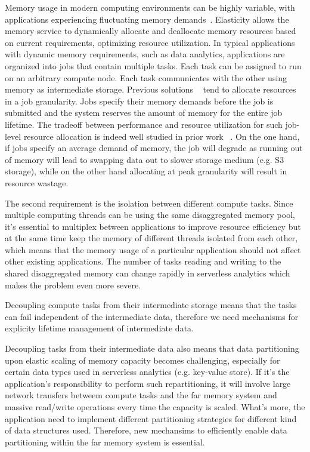   Memory usage in modern computing environments can be highly variable, with applications experiencing fluctuating memory demands~\cite{jiffy}. Elasticity allows the memory service to dynamically allocate and deallocate memory resources based on current requirements, optimizing resource utilization. In typical applications with dynamic memory requirements, such as data analytics, applications are organized into jobs that contain multiple tasks. Each task can be assigned to run on an arbitrary compute node. Each task communicates with the other using memory as intermediate storage. Previous solutions ~\cite{pocket} tend to allocate resources in a job granularity. Jobs specify their memory demands before the job is submitted and the system reserves the amount of memory for the entire job lifetime. The tradeoff between performance and resource utilization for such job-level resource allocation is indeed well studied in prior work ~\cite{jiffy}. On the one hand, if jobs specify an average demand of memory, the job will degrade as running out of memory will lead to swapping data out to slower storage medium (e.g. S3 storage), while on the other hand allocating at peak granularity will result in resource wastage.

 The second requirement is the isolation between different compute tasks. Since multiple computing threads can be using the same disaggregated memory pool, it's essential to multiplex between applications to improve resource efficiency but at the same time keep the memory of different threads isolated from each other, which means that the memory usage of a particular application should not affect other existing applications. The number of tasks reading and writing to the shared disaggregated memory can change rapidly in serverless analytics which makes the problem even more severe.

Decoupling compute tasks from their intermediate storage means that the tasks can fail independent of the intermediate data, therefore we need mechanisms for explicity lifetime management of intermediate data.

Decoupling tasks from their intermediate data also means that data partitioning upon elastic scaling of memory capacity becomes challenging, especially for certain data types used in serverless analytics (e.g. key-value store). If it's the application's responsibility to perform such repartitioning, it will involve large network transfers betweem compute tasks and the far memory system and massive read/write operations every time the capacity is scaled. What's more, the application need to implement different partitioning strategies for different kind of data structures used. Therefore, new mechansims to efficiently enable data partitioning within the far memory system is essential.


